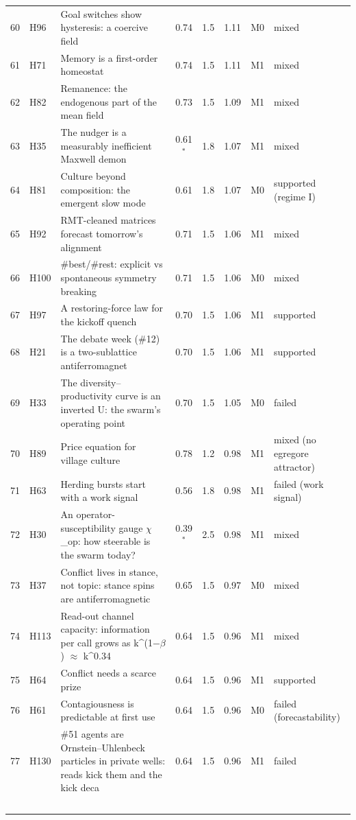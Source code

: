 \begin{table}[p]
\begin{tabular}{@{}r l p{} c c c c l@{}}
60 & H96 & Goal switches show hysteresis: a coercive field & 0.74 & 1.5 & 1.11 & M0 & mixed\\
61 & H71 & Memory is a first-order homeostat & 0.74 & 1.5 & 1.11 & M1 & mixed\\
62 & H82 & Remanence: the endogenous part of the mean field & 0.73 & 1.5 & 1.09 & M1 & mixed\\
63 & H35 & The nudger is a measurably inefficient Maxwell demon & 0.61$^\ast$ & 1.8 & 1.07 & M1 & mixed\\
64 & H81 & Culture beyond composition: the emergent slow mode & 0.61 & 1.8 & 1.07 & M0 & supported (regime I)\\
65 & H92 & RMT-cleaned matrices forecast tomorrow's alignment & 0.71 & 1.5 & 1.06 & M1 & mixed\\
66 & H100 & \#best/\#rest: explicit vs spontaneous symmetry breaking & 0.71 & 1.5 & 1.06 & M0 & mixed\\
67 & H97 & A restoring-force law for the kickoff quench & 0.70 & 1.5 & 1.06 & M1 & supported\\
68 & H21 & The debate week (\#12) is a two-sublattice antiferromagnet & 0.70 & 1.5 & 1.06 & M1 & supported\\
69 & H33 & The diversity--productivity curve is an inverted U: the swarm's operating point & 0.70 & 1.5 & 1.05 & M0 & failed\\
70 & H89 & Price equation for village culture & 0.78 & 1.2 & 0.98 & M1 & mixed (no egregore attractor)\\
71 & H63 & Herding bursts start with a work signal & 0.56 & 1.8 & 0.98 & M1 & failed (work signal)\\
72 & H30 & An operator-susceptibility gauge $\chi$\_op: how steerable is the swarm today? & 0.39$^\ast$ & 2.5 & 0.98 & M1 & mixed\\
73 & H37 & Conflict lives in stance, not topic: stance spins are antiferromagnetic & 0.65 & 1.5 & 0.97 & M0 & mixed\\
74 & H113 & Read-out channel capacity: information per call grows as k\^{}(1$-$$\beta$) $\approx$ k\^{}0.34 & 0.64 & 1.5 & 0.96 & M1 & mixed\\
75 & H64 & Conflict needs a scarce prize & 0.64 & 1.5 & 0.96 & M1 & supported\\
76 & H61 & Contagiousness is predictable at first use & 0.64 & 1.5 & 0.96 & M0 & failed (forecastability)\\
77 & H130 & \#51 agents are Ornstein--Uhlenbeck particles in private wells: reads kick them and the kick deca & 0.64 & 1.5 & 0.96 & M1 & failed\\
$$
\end{tabular}
\end{table}
